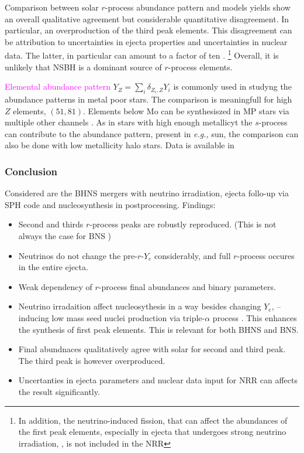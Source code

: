 \documentclass[11pt,a4paper,headinclude=true,DIV=14,BCOR=8mm,chapterprefix,listof=totoc,twoside,openright,abstracton]{scrbook}
\newcommand{\magenta}[1]{\textcolor{magenta}{#1}} %
\begin{document}
Comparison between solar $r$-process abundance pattern and models yields show an overall qualitative agreement but considerable quantitative disagreement. In particular, an overproduction of the third peak elements. This disagreement can be attribution to uncertainties in ejecta properties and uncertainties in nuclear data. The latter, in particular can amount to a factor of ten \cite{Mumpower et al., 2015}.
\footnote{In addition, the neutrino-induced fission, that can affect the abundances of the first peak elements, especially in ejecta that undergoes strong neutrino irradiation, \cite{Qian, 2002; Kolbe et al., 2004}, is not included in the NRR} 
Overall, it is unlikely that NSBH is a dominant source of $r$-process elements. 

\magenta{Elemental abundance pattern} $Y_Z = \sum_i \delta_{Z_i,Z}Y_i$ is commonly used in studyng the abundance patterns in metal poor stars. The comparison is meaningfull for high $Z$ elements, $(51,81)$. Elements below Mo can be synthesiszed in MP stars via multiple other channels \cite{Travaglio et al., 2004; Montes et al., 2007; Qian andWasserburg, 2008; Arcones and Montes, 2011; Hansen et al., 2014}.
As in stars with high enough metallicyt the $s$-process can contribute to the abundance pattern, present in \textit{e.g.,} sun, the comparison can also be done with low metallicity halo stars. Data is available in \cite{Westin et al., 2000, Roederer et al., 2012, and Roederer et al., 2014}

\subsubsection{Conclusion}
Considered are the BHNS mergers with neutrino irradiation, ejecta follo-up via SPH code and nucleosynthesis in postprocessing. 
Findings: 
\begin{itemize}
    \item Second and thirds $r$-process peaks are robustly reproduced. (This is not always the case for BNS \cite{Wanajo et al., 2014; Goriely et al., 2015; Sekiguchi et al., 2015} )
    \item Neutrinos do not change the pre-$r$-$Y_e$ considerably, and full $r$-process occures in the entire ejecta. 
    \item Weak dependency of $r$-process final abundances and binary parameters.
    \item Neutrino irradaition affect nucleosythesis in a way besides changing $Y_e$, -- inducing low mass seed nuclei production via triple-$\alpha$ process \cite{Fuller and Meyer, 1995, Meyer et al., 1998}. This enhances the synthesis of first peak elements. This is relevant for both BHNS and BNS. 
    \item Final abundnaces qualitatively agree with solar for second and third peak. The third peak is however overproduced. 
    \item Uncertanties in ejecta parameters and nuclear data input for NRR can affects the result significantly.
\end{itemize}
\end{document}
